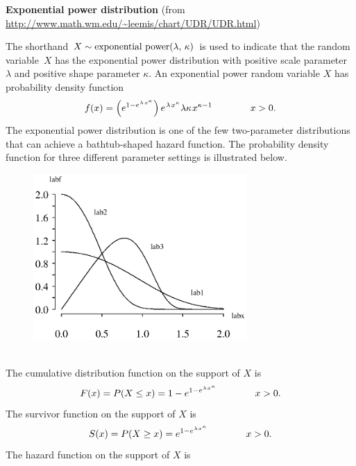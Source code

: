 \documentclass[12pt,fullpage]{article}
\begin{document}
\noindent
{\bf Exponential power distribution} (from \color{blue}\url{http://www.math.wm.edu/~leemis/chart/UDR/UDR.html}\color{black})

\noindent
The shorthand $X \sim \hbox{exponential power}(\lambda, \, \kappa)$ is used to indicate that the
random variable~$X$ has the exponential power distribution with positive scale parameter $\lambda$ and positive shape parameter $\kappa$.
An exponential power random variable $X$ has probability density function 
$$
f(x) = \left(e ^ {1 - e ^ {\kern 0.04 em \lambda \kern 0.08 em x ^ \kappa}} \right) e ^ {\kern 0.08 em \lambda \kern 0.08 em x ^ \kappa} \lambda \kappa \kern 0.08 em x ^ {\kappa - 1} \qquad \qquad x > 0.
$$
The exponential power distribution is one of the few two-parameter distributions that
can achieve a bathtub-shaped hazard function.
The probability density function for three different parameter settings is illustrated below.
{\begin{figure}[h!]
\begin{center}
\includegraphics[width=3.2in]{ExponentialpowerPlot.ps}
\end{center}
\end{figure}}\\
The cumulative distribution function on
the support of $X$ is
$$
F(x) = P(X \le x) = 1 -  e ^ {1 - e ^ {\kern 0.04 em \lambda \kern 0.04 em x ^ {\kern 0.04em \kappa}}} \qquad \qquad x > 0.
$$
The survivor function on the support of $X$ is
$$
S(x) = P(X \ge x) = e ^ {1 - e ^ {\kern 0.04 em \lambda \kern 0.04 em x ^ {\kern 0.04em \kappa}}} \qquad \qquad x > 0.
$$
The hazard function on the support of $X$ is
\end{document}
